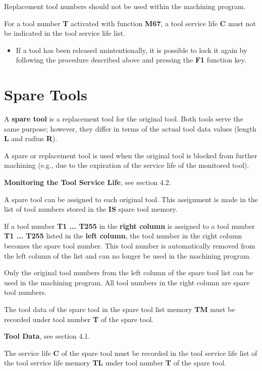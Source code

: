 Replacement tool numbers should not be used within the machining program.

For a tool number \textbf{T} activated with function \textbf{M67}, a tool service life \textbf{C} must not be indicated in the tool service life list.

\begin{itemize}
    \item If a tool has been released unintentionally, it is possible to lock it again by following the procedure described above and pressing the \textbf{F1} function key.
\end{itemize}

\newpage

\section{Spare Tools}

A \textbf{spare tool} is a replacement tool for the original tool. Both tools serve the same purpose; however, they differ in terms of the actual tool data values (length \textbf{L} and radius \textbf{R}).

A spare or replacement tool is used when the original tool is blocked from further machining (e.g., due to the expiration of the service life of the monitored tool).

\textbf{Monitoring the Tool Service Life}, see section 4.2.

A spare tool can be assigned to each original tool.  
This assignment is made in the list of tool numbers stored in the \textbf{IS} spare tool memory.

If a tool number \textbf{T1 ... T255} in the \textbf{right column} is assigned to a tool number \textbf{T1 ... T255} listed in the \textbf{left column}, the tool number in the right column becomes the spare tool number.  
This tool number is automatically removed from the left column of the list and can no longer be used in the machining program.

Only the original tool numbers from the left column of the spare tool list can be used in the machining program.  
All tool numbers in the right column are spare tool numbers.

The tool data of the spare tool in the spare tool list memory \textbf{TM} must be recorded under tool number \textbf{T} of the spare tool.

\textbf{Tool Data}, see section 4.1.

The service life \textbf{C} of the spare tool must be recorded in the tool service life list of the tool service life memory \textbf{TL} under tool number \textbf{T} of the spare tool.


